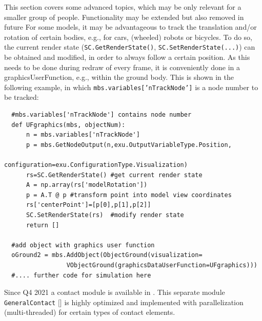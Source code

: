  \label{sec:exudynAdvanced}
%
This section covers some advanced topics, which may be only relevant for a smaller group of people. 
Functionality may be extended but also removed in future
%
\label{secInteractModelView}
For some models, it may be advantageous to track the translation and/or rotation of certain bodies, e.g., for cars, (wheeled) robots or bicycles. 
To do so, the current render state (\texttt{SC.GetRenderState()}, \texttt{SC.SetRenderState(...)}) can be obtained and modified, in order to always follow a certain position.
As this needs to be done during redraw of every frame, it is conveniently done in a graphicsUserFunction, e.g., within the ground body. This is shown in the following example, in which \texttt{mbs.variables['nTrackNode']} is a node number to be tracked:
%
\pythonstyle\begin{lstlisting}
  #mbs.variables['nTrackNode'] contains node number
  def UFgraphics(mbs, objectNum):
      n = mbs.variables['nTrackNode']
      p = mbs.GetNodeOutput(n,exu.OutputVariableType.Position, 
                            configuration=exu.ConfigurationType.Visualization)
      rs=SC.GetRenderState() #get current render state
      A = np.array(rs['modelRotation'])
      p = A.T @ p #transform point into model view coordinates
      rs['centerPoint']=[p[0],p[1],p[2]]
      SC.SetRenderState(rs)  #modify render state
      return []

  #add object with graphics user function
  oGround2 = mbs.AddObject(ObjectGround(visualization=
                 VObjectGround(graphicsDataUserFunction=UFgraphics)))
  #.... further code for simulation here
\end{lstlisting}
%
%
Since Q4 2021 a contact module is available in \codeName. 
This separate module \texttt{GeneralContact} $[$$]$ is highly optimized and implemented with parallelization (multi-threaded) for certain types of contact elements.
